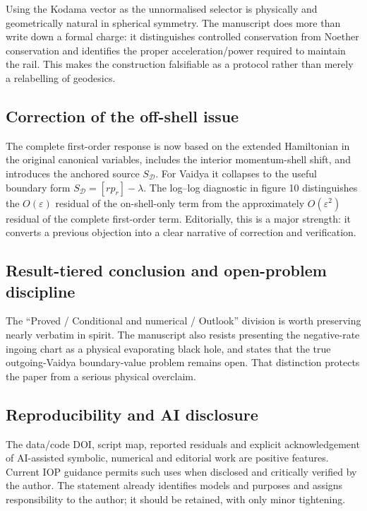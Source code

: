 \documentclass[11pt,a4paper]{article}
\begin{document}
Using the Kodama vector as the unnormalised selector is physically and geometrically natural in
spherical symmetry.  The manuscript does more than write down a formal charge: it distinguishes
controlled conservation from Noether conservation and identifies the proper acceleration/power
required to maintain the rail.  This makes the construction falsifiable as a protocol rather
than merely a relabelling of geodesics.

\subsection{Correction of the off-shell issue}

The complete first-order response is now based on the extended Hamiltonian in the original
canonical variables, includes the interior momentum-shell shift, and introduces the anchored
source $S_{\mathcal D}$.  For Vaidya it collapses to the useful boundary form
$S_{\mathcal D}=[r p_r]-\lambda$.  The log--log diagnostic in figure 10 distinguishes the
$O(\varepsilon)$ residual of the on-shell-only term from the approximately
$O(\varepsilon^2)$ residual of the complete first-order term.  Editorially, this is a major
strength: it converts a previous objection into a clear narrative of correction and verification.

\subsection{Result-tiered conclusion and open-problem discipline}

The ``Proved / Conditional and numerical / Outlook'' division is worth preserving nearly
verbatim in spirit.  The manuscript also resists presenting the negative-rate ingoing chart as a
physical evaporating black hole, and states that the true outgoing-Vaidya boundary-value problem
remains open.  That distinction protects the paper from a serious physical overclaim.

\subsection{Reproducibility and AI disclosure}

The data/code DOI, script map, reported residuals and explicit acknowledgement of AI-assisted
symbolic, numerical and editorial work are positive features.  Current IOP guidance permits such
uses when disclosed and critically verified by the author.  The statement already identifies
models and purposes and assigns responsibility to the author; it should be retained, with only
minor tightening.
\end{document}
